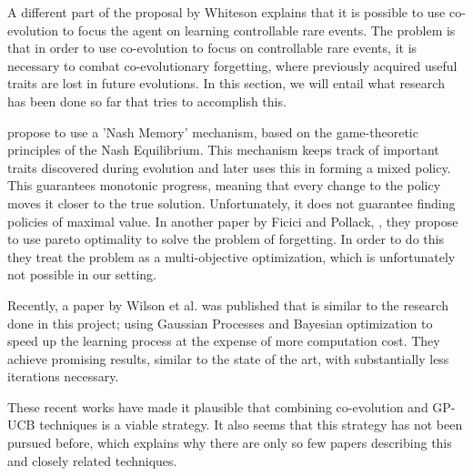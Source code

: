 

A different part of the proposal by Whiteson explains that it is possible to use co-evolution to focus the agent on learning controllable rare events. The problem is that in order to use co-evolution to focus on controllable rare events, it is necessary to combat co-evolutionary forgetting, where previously acquired useful traits are lost in future evolutions. In this section, we will entail what research has been done so far that tries to accomplish this.

\cite{ficici2003game} propose to use a 'Nash Memory' mechanism, based on the game-theoretic principles of the Nash Equilibrium. This mechanism keeps track of important traits discovered during evolution and later uses this in forming a mixed policy. This guarantees monotonic progress, meaning that every change to the policy moves it closer to the true solution. Unfortunately, it does not guarantee finding policies of maximal value. In another paper by Ficici and Pollack, \cite{ficici2001pareto}, they propose to use pareto optimality to solve the problem of forgetting. In order to do this they treat the problem as a multi-objective optimization, which is unfortunately not possible in our setting.

Recently, a paper by Wilson et al. \cite{wilson2014using} was published that is similar to the research done in this project; using Gaussian Processes and Bayesian optimization to speed up the learning process at the expense of more computation cost. They achieve promising results, similar to the state of the art, with substantially less iterations necessary.

These recent works have made it plausible that combining co-evolution and GP-UCB techniques is a viable strategy. It also seems that this strategy has not been pursued before, which explains why there are only so few papers describing this and closely related techniques. 
